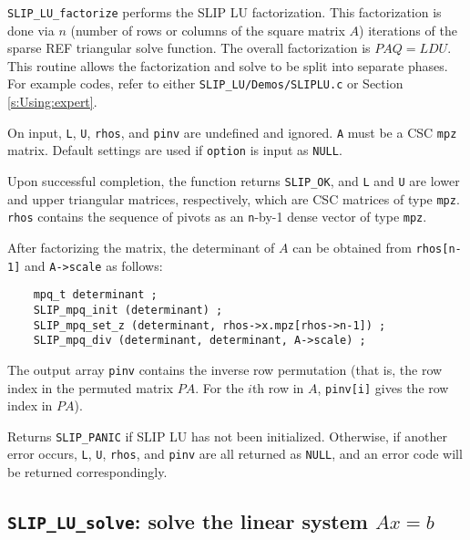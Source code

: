 \documentclass[12pt]{article}
\theoremstyle{definition}
\begin{document}
\verb|SLIP_LU_factorize| performs the SLIP LU factorization. This factorization
is done via $n$ (number of rows or columns of the square matrix $A$) iterations
of the sparse REF triangular solve function. The overall factorization is $PAQ
= LDU$.  This routine allows the factorization and solve to be split into
separate phases.  For example codes, refer to either
\verb|SLIP_LU/Demos/SLIPLU.c| or Section \ref{s:Using:expert}.

On input, \verb|L|, \verb|U|, \verb|rhos|, and \verb|pinv| are undefined and
ignored.  \verb|A| must be a CSC \verb|mpz| matrix. Default settings are used
if \verb|option| is input as \verb|NULL|.

Upon successful completion, the function returns \verb|SLIP_OK|, and \verb|L|
and \verb|U| are lower and upper triangular matrices, respectively, which are
CSC matrices of type \verb|mpz|.  \verb|rhos| contains the sequence of pivots
as an \verb|n|-by-1 dense vector of type \verb|mpz|.

After factorizing the matrix, the determinant of $A$ can be obtained from
\verb|rhos[n-1]| and \verb|A->scale| as follows:

\begin{verbatim}
    mpq_t determinant ;
    SLIP_mpq_init (determinant) ;
    SLIP_mpq_set_z (determinant, rhos->x.mpz[rhos->n-1]) ;
    SLIP_mpq_div (determinant, determinant, A->scale) ;
\end{verbatim}

The output array \verb|pinv| contains the inverse row permutation (that is, the
row index in the permuted matrix $PA$. For the $i$th row in $A$, \verb|pinv[i]|
gives the row index in $PA$). 

Returns \verb|SLIP_PANIC| if SLIP LU has not been initialized.  Otherwise, if
another error occurs, \verb|L|, \verb|U|, \verb|rhos|, and \verb|pinv| are all
returned as \verb|NULL|, and an error code will be returned correspondingly.

\newpage
\cprotect\subsection{\verb|SLIP_LU_solve|: solve the linear system $Ax=b$}
\label{ss:SLIP_LU_solve}
\end{document}

